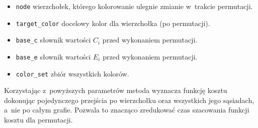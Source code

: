 \documentclass[a4paper,10pt]{article}
\begin{document}
\begin{itemize}
    \item \verb+node+ wierzchołek, którego kolorowanie ulegnie zmianie w~trakcie permutacji.
    \item \verb+target_color+ docelowy kolor dla wierzchołka (po permutacji).
    \item \verb+base_c+ słownik wartości $C_{i}$ przed wykonaniem permutacji.
    \item \verb+base_e+ słownik wartości $E_{i}$ przed wykonaniem permutacji.
    \item \verb+color_set+ zbiór wszystkich kolorów.
\end{itemize}

\noindent Korzystając z~powyższych parametrów metoda wyznacza funkcję kosztu dokonując pojedynczego przejścia po wierzchołku oraz wszystkich jego sąsiadach, a~nie po całym grafie. Pozwala to znacząco zredukować czas szacowania funkcji kosztu dla permutacji.
\end{document}
